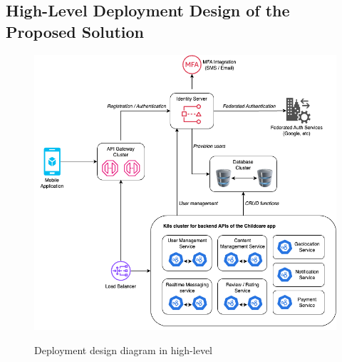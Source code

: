 \subsection{High-Level Deployment Design of the Proposed Solution}


\begin{figure}[htp]
	\center
	{{\includegraphics[width=0.9\columnwidth,keepaspectratio]{Figures/diagram.png}}}
	\caption{Deployment design diagram in high-level}%
	\label{fig:deploymentdiagram}%
\end{figure}